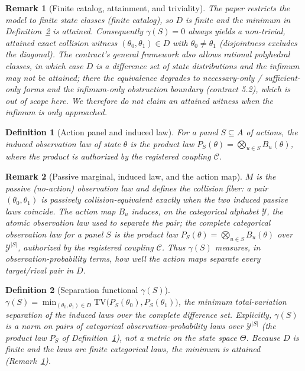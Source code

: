 \documentclass[11pt]{article}
\newtheorem{definition}{Definition}
\newtheorem{remark}{Remark}
\begin{document}
\begin{remark}[Finite catalog, attainment, and triviality]\label{rem:attain}
The paper restricts the model to \emph{finite} state classes (finite catalog), so $D$ is finite and the
minimum in Definition~\ref{def:gamma} is attained. Consequently $\gamma(S)=0$ always yields a
\emph{non-trivial, attained} exact collision witness $(\theta_0,\theta_1)\in D$ with
$\theta_0\neq\theta_1$ (disjointness excludes the diagonal). The contract's general framework also
allows \emph{rational polyhedral} classes, in which case $D$ is a difference set of state
distributions and the infimum may not be attained; there the equivalence degrades to
necessary-only / sufficient-only forms and the infimum-only obstruction boundary (contract 5.2), which
is out of scope here. We therefore do \emph{not} claim an attained witness when the infimum is only
approached.
\end{remark}

\begin{definition}[Action panel and induced law]\label{def:panel}
For a panel $S\subseteq A$ of actions, the \emph{induced observation law} of state $\theta$ is the
product law $P_S(\theta)=\bigotimes_{u\in S}B_u(\theta)$, where the product is authorized by the
registered coupling $\mathcal{C}$.
\end{definition}

\begin{remark}[Passive marginal, induced law, and the action map]\label{rem:passive}
$M$ is the \emph{passive} (no-action) observation law and defines the collision fiber: a pair
$(\theta_0,\theta_1)$ is passively collision-equivalent exactly when the two induced passive laws
coincide. The action map $B_u$ induces, on the categorical alphabet $\mathcal{Y}$, the atomic
observation law used to \emph{separate} the pair; the complete \emph{categorical observation law} for a
panel $S$ is the product law $P_S(\theta)=\bigotimes_{u\in S}B_u(\theta)$ over
$\mathcal{Y}^{|S|}$,
authorized by the registered coupling $\mathcal{C}$. Thus $\gamma(S)$ measures, in
\emph{observation-probability} terms, how well the action maps separate every target/rival pair in $D$.
\end{remark}

\begin{definition}[Separation functional $\gamma(S)$]\label{def:gamma}
$\gamma(S)=\min_{(\theta_0,\theta_1)\in D}\mathrm{TV}\bigl(P_S(\theta_0),P_S(\theta_1)\bigr)$,
the minimum total-variation separation of the induced laws over the complete difference set. Explicitly,
$\gamma(S)$ is a norm on pairs of \emph{categorical observation-probability} laws over
$\mathcal{Y}^{|S|}$ (the product law $P_S$ of Definition~\ref{def:panel}), \emph{not} a metric on the
state space $\Theta$. Because $D$ is finite and the laws are finite categorical laws, the minimum is
attained (Remark~\ref{rem:attain}).
\end{definition}
\end{document}
